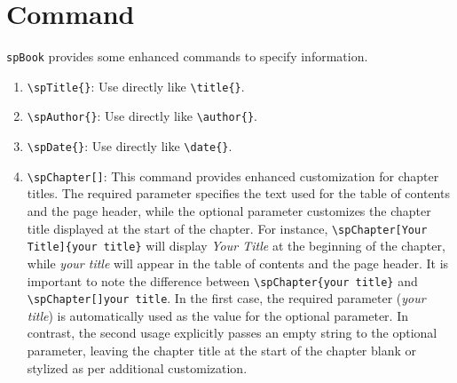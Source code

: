 \section{Command}
    \texttt{spBook} provides some enhanced commands to specify information. 
    \begin{enumerate}
        \item \texttt{\textbackslash spTitle\{\}}: Use directly like \texttt{\textbackslash title\{\}}.
        \item \texttt{\textbackslash spAuthor\{\}}: Use directly like \texttt{\textbackslash author\{\}}.
        \item \texttt{\textbackslash spDate\{\}}: Use directly like \texttt{\textbackslash date\{\}}.
        \item \texttt{\textbackslash spChapter[]{}}: This command provides enhanced customization for chapter titles. The required parameter specifies the text used for the table of contents and the page header, while the optional parameter customizes the chapter title displayed at the start of the chapter. For instance, \texttt{\textbackslash spChapter[Your Title]\{your title\}} will display \emph{Your Title} at the beginning of the chapter, while \emph{your title} will appear in the table of contents and the page header. It is important to note the difference between \texttt{\textbackslash spChapter\{your title\}} and \texttt{\textbackslash spChapter[]{your title}}. In the first case, the required parameter (\emph{your title}) is automatically used as the value for the optional parameter. In contrast, the second usage explicitly passes an empty string to the optional parameter, leaving the chapter title at the start of the chapter blank or stylized as per additional customization.
    \end{enumerate}